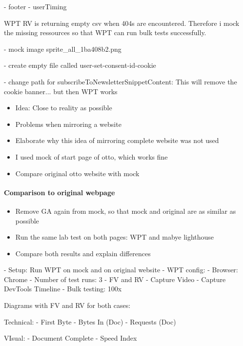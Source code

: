 - footer
- userTiming


WPT RV is returning empty csv when 404s are encountered.
Therefore i mock the missing ressources so that WPT can run bulk tests successfully.

- mock image sprite\_all\_1ba408b2.png

- create empty file called user-set-consent-id-cookie

- change path for subscribeToNewsletterSnippetContent: This will remove the cookie banner... but then WPT works



\begin{itemize}
    \item Idea: Close to reality as possible
    \item Problems when mirroring a website
    \item Elaborate why this idea of mirroring complete website was not used
    \item I used mock of start page of otto, which works fine
    \item Compare original otto website with mock
\end{itemize}





\paragraph{Comparison to original webpage}

\begin{itemize}
    \item Remove GA again from mock, so that mock and original are as similar as possible
    \item Run the same lab test on both pages: WPT and mabye lighthouse
    \item Compare both results and explain differences
\end{itemize}



- Setup: Run WPT on mock and on original website
- WPT config:
- Browser: Chrome
- Number of test runs: 3
- FV and RV
- Capture Video
- Capture DevTools Timeline
- Bulk testing: 100x



Diagrams with FV and RV for both cases:

Technical:
- First Byte
- Bytes In (Doc)
- Requests (Doc)

VIsual:
- Document Complete
- Speed Index


